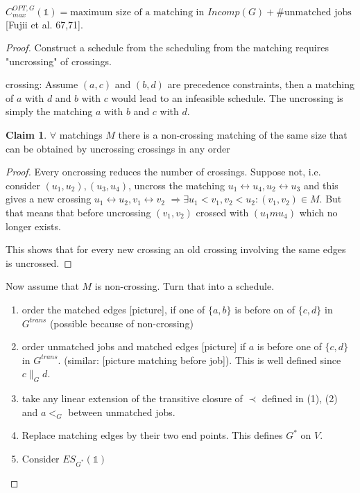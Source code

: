 \documentclass[11pt,a4paper,notitlepage]{article}
\theoremstyle{plain}
\theoremstyle{definition}
\newtheorem*{claim}{Claim}
\begin{document}
\begin{theorem}
  $C_{max}^{OPT, G}(\mathds{1}) = \text{maximum size of a matching in } Incomp(G) + \#\text{unmatched jobs}$ [Fujii et al. 67,71].
\end{theorem}

\begin{proof}
  Construct a schedule from the scheduling from the matching requires
  "uncrossing" of crossings.

  crossing:
  Assume $(a,c)$ and $(b,d)$ are precedence constraints, then a matching of $a$
  with $d$ and $b$ with $c$ would lead to an infeasible schedule. The
  uncrossing is simply the matching $a$ with $b$ and $c$ with $d$.

  \begin{claim}
    $\forall$ matchings $M$ there is a non-crossing matching of the same size
    that can be obtained by uncrossing crossings in any order
  \end{claim}

  \begin{proof}
    Every oncrossing reduces the number of crossings. Suppose not, i.e.
    consider $(u_{1}, u_{2}), (u_{3}, u_{4})$, uncross the matching
    $u_{1}\leftrightarrow u_{4}, u_{2}\leftrightarrow u_{3}$ and this gives a
    new crossing $u_{1}\leftrightarrow u_{2}, v_{1}\leftrightarrow v_{2}$
    $\Rightarrow \exists u_{1}<v_{1}, v_{2}<u_{2}: (v_{1},v_{2})\in M$.
    But that means that before uncrossing $(v_{1},v_{2})$ crossed with
    $(u_{1}m u_{4})$ which no longer exists.

    This shows that for every new crossing an old crossing involving the same
    edges is uncrossed.
  \end{proof}

  Now assume that $M$ is non-crossing. Turn that into a schedule.
  \begin{enumerate}
    \item order the matched edges [picture], if one of $\{a,b\}$ is before on
      of $\{c,d\}$ in $G^{trans}$ (possible because of non-crossing)
    \item order unmatched jobs and matched edges [picture] if $a$ is before
      one of $\{c,d\}$ in $G^{trans}$. (similar: [picture matching before job]).
      This is well defined since $c\parallel_{G} d$.
    \item take any linear extension of the transitive closure of $\prec$
      defined in (1), (2) and $a<_{G}$ between unmatched jobs.
    \item Replace matching edges by their two end points. This defines $G^{*}$
      on $V$.
    \item Consider $ES_{G^{*}}(\mathds{1})$
  \end{enumerate}
\end{proof}
\end{document}
